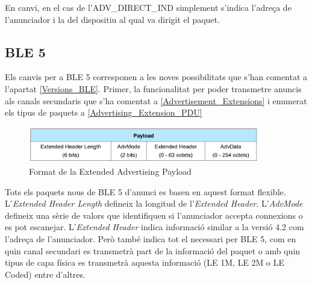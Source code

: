 En canvi, en el cas de l'ADV\_DIRECT\_IND simplement s'indica l'adreça de l'anunciador i la del dispositiu al qual va dirigit el paquet.

\subsection{BLE 5}
Els canvis per a BLE 5 corresponen a les noves possibilitats que s'han comentat a l'apartat \ref{Versions_BLE}.
Primer, la funcionalitat per poder transmetre anuncis als canals secundaris que s'ha comentat a \ref{Advertisement_Extensions} i enumerat els tipus de paquets a \ref{Advertising_Extension_PDU}

\begin{figure}[!h]
	\begin{center}
		\includegraphics[width=0.9\textwidth]{./images/Common_Extended_Advertising_Payload_Format.png}
		\caption{Format de la Extended Advertising Payload \cite{BLE_5_Extended_Advertising}}
	\end{center}
\end{figure}

Tots els paquets nous de BLE 5 d'anunci es basen en aquest format flexible.
L'\textit{Extended Header Length} defineix la longitud de l'\textit{Extended Header}.
L'\textit{AdvMode} defineix una sèrie de valors que identifiquen si l'anunciador accepta connexions o es pot escanejar.
L'\textit{Extended Header} indica informació similar a la versió 4.2 com l'adreça de l'anunciador.
Però també indica tot el necessari per BLE 5, com en quin canal secundari es transmetrà part de la informació del paquet o amb quin tipus de capa física es transmetrà aquesta informació (LE 1M, LE 2M o LE Coded) entre d'altres.
